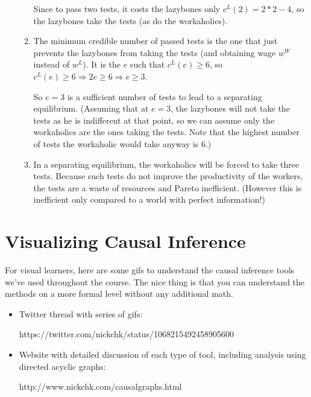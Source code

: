 \documentclass[letter,12pt]{article}
\begin{document}
\begin{itemize}
\begin{enumerate}
		Since to pass two tests, it costs the lazybones only $c^L(2)=2*2-4$, so the lazybones take the tests (as do the workaholics).
		\item The minimum credible number of passed tests is the one that just prevents the lazybones from taking the tests (and obtaining wage $w^W$ instead of $w^L$). It is the $e$ such that $c^L(e)\geq6$, so $c^L(e)\geq 6 \Rightarrow 2e\geq 6 \Rightarrow e\geq 3$.
		
		So $e = 3$ is a sufficient number of tests to lead to a separating equilibrium. (Assuming that at $e = 3$, the lazybones will not take the tests as he is indifferent at that point, so we can assume only the workaholics are the ones taking the tests. Note that the highest number of tests the workaholic would take anyway is 6.)

		\item In a separating equilibrium, the workaholics will be forced to take three tests. Because such tests do not improve the productivity of the workers, the tests are a waste of resources and Pareto inefficient. (However this is inefficient only compared to a world with perfect information!)

	\end{enumerate}
\end{itemize} 


\section{Visualizing Causal Inference}

For visual learners, here are some gifs to understand the causal inference tools we've used throughout the course. The nice thing is that you can understand the methods on a more formal level without any additional math.

\begin{itemize}
	\item Twitter thread with series of gifs: 
	
	https://twitter.com/nickchk/status/1068215492458905600
	\item Website with detailed discussion of each type of tool, including analysis using directed acyclic graphs:
	
	http://www.nickchk.com/causalgraphs.html
\end{itemize}
\end{document}
